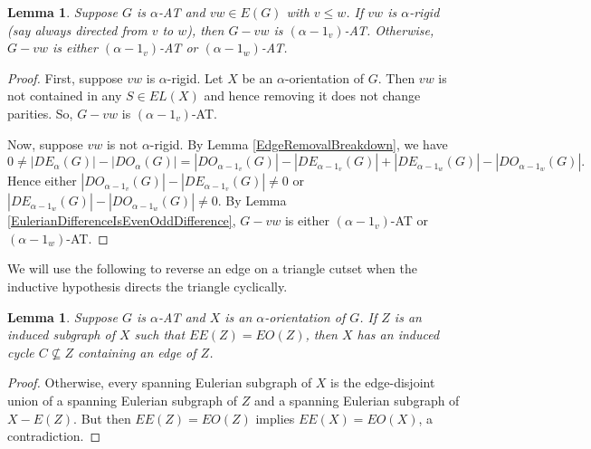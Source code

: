 \documentclass[12pt]{article}
\theoremstyle{plain}
\newtheorem{lem}[thm]{Lemma}
\theoremstyle{definition}
\theoremstyle{remark}
\begin{document}
\begin{lem}\label{EdgeRemoval}
	Suppose $G$ is $\alpha$-AT and $vw \in E(G)$ with $v \le w$.  If $vw$ is $\alpha$-rigid (say always directed from $v$ to $w$), then $G-vw$ is $(\alpha - 1_v)$-AT.  Otherwise, $G-vw$ is either $(\alpha - 1_v)$-AT or $(\alpha - 1_w)$-AT.
\end{lem}
\begin{proof}
	First, suppose $vw$ is $\alpha$-rigid.  Let $X$ be an $\alpha$-orientation of $G$.  Then $vw$ is not contained in any $S \in EL(X)$ and hence removing it does not change parities. So, $G-vw$ is $(\alpha - 1_v)$-AT.
	
	Now, suppose $vw$ is not $\alpha$-rigid.  By Lemma \ref{EdgeRemovalBreakdown}, we have
	\[0 \ne |DE_\alpha(G)| - |DO_\alpha(G)| = |DO_{\alpha - 1_v}(G)| - |DE_{\alpha - 1_v}(G)| + |DE_{\alpha - 1_w}(G)| - |DO_{\alpha - 1_w}(G)|.\]
	Hence either $|DO_{\alpha - 1_v}(G)| - |DE_{\alpha - 1_v}(G)| \ne 0$ or $|DE_{\alpha - 1_w}(G)| - |DO_{\alpha - 1_w}(G)| \ne 0$.  By Lemma \ref{EulerianDifferenceIsEvenOddDifference}, $G-vw$ is either $(\alpha - 1_v)$-AT or $(\alpha - 1_w)$-AT.
\end{proof}


We will use the following to reverse an edge on a triangle cutset when the inductive hypothesis directs the triangle cyclically.
\begin{lem}\label{EdgeRemoval}
	Suppose $G$ is $\alpha$-AT and $X$ is an $\alpha$-orientation of $G$.  If $Z$ is an induced subgraph of $X$ such that $EE(Z) = EO(Z)$, then $X$ has an induced cycle $C \not \subseteq Z$ containing an edge of $Z$.
\end{lem}
\begin{proof}
	Otherwise, every spanning Eulerian subgraph of $X$ is the edge-disjoint union of a spanning Eulerian subgraph of $Z$ and a spanning Eulerian subgraph of $X - E(Z)$.  But then $EE(Z) = EO(Z)$ implies $EE(X) = EO(X)$, a contradiction.
\end{proof}



\end{document}
